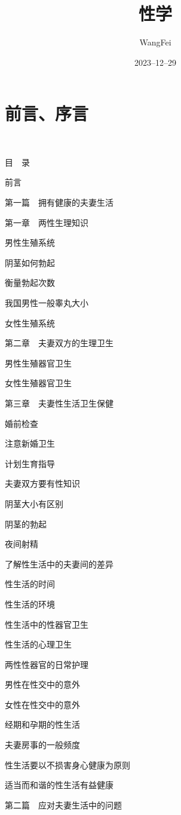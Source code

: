 \documentclass[12pt,UTF8]{ctexbook}
\title{\heiti\zihao{0} 性学}
\author{WangFei}
\date{2023--12--29}
\begin{document}
\maketitle
\tableofcontents

\frontmatter
\chapter{前言、序言}

\mainmatter

~\\

 \qquad  

目　录

前言

第一篇　拥有健康的夫妻生活

第一章　两性生理知识

男性生殖系统

阴茎如何勃起

衡量勃起次数

我国男性一般睾丸大小

女性生殖系统

第二章　夫妻双方的生理卫生

男性生殖器官卫生

女性生殖器官卫生

第三章　夫妻性生活卫生保健

婚前检查

注意新婚卫生

计划生育指导

夫妻双方要有性知识

阴茎大小有区别

阴茎的勃起

夜间射精

了解性生活中的夫妻间的差异

性生活的时间

性生活的环境

性生活中的性器官卫生

性生活的心理卫生

两性性器官的日常护理

男性在性交中的意外

女性在性交中的意外

经期和孕期的性生活

夫妻房事的一般频度

性生活要以不损害身心健康为原则

适当而和谐的性生活有益健康

第二篇　应对夫妻生活中的问题
\end{document}

